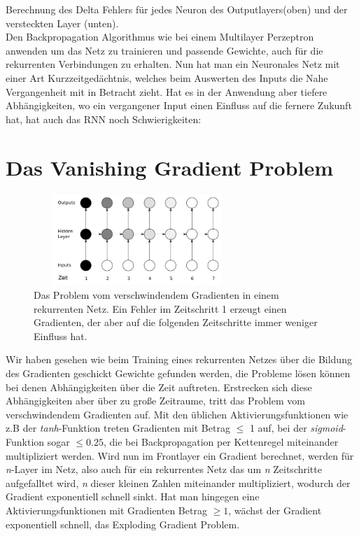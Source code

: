 Berechnung des Delta Fehlers für jedes Neuron des Outputlayers(oben) und der versteckten Layer (unten). \\ \cite{bib:rnn}
Den Backpropagation Algorithmus wie bei einem Multilayer Perzeptron anwenden um das Netz zu trainieren und passende Gewichte, auch für die rekurrenten Verbindungen zu erhalten. Nun hat man ein Neuronales Netz mit einer Art Kurzzeitgedächtnis, welches beim Auswerten des Inputs die Nahe Vergangenheit mit in Betracht zieht. Hat es in der Anwendung aber tiefere Abhängigkeiten, wo ein vergangener Input einen Einfluss auf die fernere Zukunft hat, hat auch das RNN noch Schwierigkeiten: 
\section{Das Vanishing Gradient Problem}
\begin{figure}
	\centering
	\includegraphics[width=0.7\textwidth, height=130px]{pics/vgp.jpg}	
	\caption{Das Problem vom verschwindendem Gradienten in einem rekurrenten Netz. Ein Fehler im Zeitschritt 1 erzeugt einen Gradienten, der aber auf die folgenden Zeitschritte immer weniger Einfluss hat.\cite{bib:vgp}}
	\label{img:vgp}
\end{figure}
Wir haben gesehen wie beim Training eines rekurrenten Netzes über die Bildung des Gradienten geschickt Gewichte gefunden werden, die Probleme lösen können bei denen Abhängigkeiten über die Zeit auftreten. Erstrecken sich diese Abhängigkeiten aber über zu große Zeitraume, tritt das Problem vom verschwindendem Gradienten auf. Mit den üblichen Aktivierungsfunktionen wie z.B der \textit{tanh}-Funktion treten Gradienten mit Betrag \(\leq\) 1 auf, bei der \textit{sigmoid}-Funktion sogar \(\leq 0.25\), die bei Backpropagation per Kettenregel miteinander multipliziert werden. Wird nun im Frontlayer ein Gradient berechnet, werden für \textit{n}-Layer im Netz, also auch für ein rekurrentes Netz das um \textit{n} Zeitschritte aufgefalltet wird, \textit{n} dieser kleinen Zahlen miteinander multipliziert, wodurch der Gradient exponentiell schnell sinkt. Hat man hingegen eine Aktivierungsfunktionen mit Gradienten Betrag \(\geq 1\), wächst der Gradient exponentiell schnell, das Exploding Gradient Problem.

